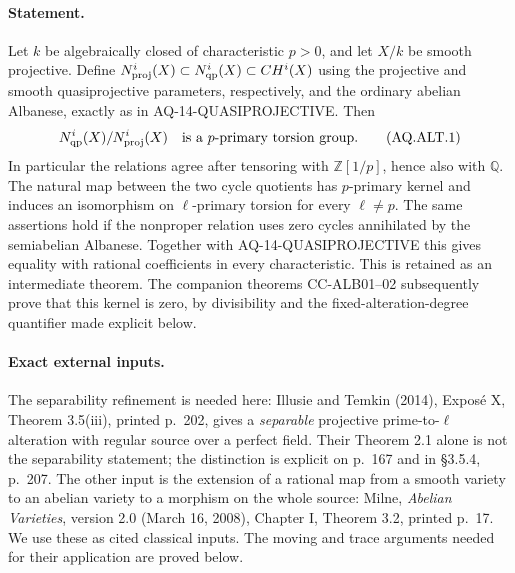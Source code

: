 \documentclass[11pt,a4paper]{article}
\theoremstyle{definition}\newtheorem{definition}[theorem]{Definition}
\theoremstyle{remark}\newtheorem{remark}[theorem]{Remark}
\begin{document}
\paragraph{Statement.}
Let $k$ be algebraically closed of characteristic $p>0$,
and let $X/k$ be smooth projective.  Define
$N^i_{\rm proj}(X)\subset N^i_{\rm qp}(X)\subset CH^i(X)$
using the projective and smooth quasiprojective parameters,
respectively, and the ordinary abelian Albanese, exactly as
in AQ-14-QUASIPROJECTIVE.  Then
\[
 N^i_{\rm qp}(X)/N^i_{\rm proj}(X)
 \quad\hbox{is a $p$-primary torsion group.}               \tag{AQ.ALT.1}
\]
In particular the relations agree after tensoring with
$\mathbb Z[1/p]$, hence also with $\mathbb Q$.
The natural map between the two cycle quotients has
$p$-primary kernel and induces an isomorphism on
$\ell$-primary torsion for every $\ell\ne p$.
The same assertions hold if the nonproper relation uses
zero cycles annihilated by the semiabelian Albanese.
Together with AQ-14-QUASIPROJECTIVE this gives equality
with rational coefficients in every characteristic.
This is retained as an intermediate theorem.  The companion
theorems CC-ALB01--02 subsequently prove that this kernel
is zero, by divisibility and the fixed-alteration-degree
quantifier made explicit below.

\paragraph{Exact external inputs.}
The separability refinement is needed here: Illusie and
Temkin (2014), Expos\'e X, Theorem 3.5(iii), printed p.~202,
gives a \emph{separable} projective prime-to-$\ell$ alteration
with regular source over a perfect field.  Their
Theorem 2.1 alone is not the separability statement;
the distinction is explicit on p.~167 and in \S3.5.4,
p.~207.  The other input is the extension of a rational
map from a smooth variety to an abelian variety to a
morphism on the whole source: Milne, \emph{Abelian
Varieties}, version 2.0 (March 16, 2008), Chapter I,
Theorem 3.2, printed p.~17.  We use these as cited
classical inputs.  The moving and trace arguments
needed for their application are proved below.
\end{document}
